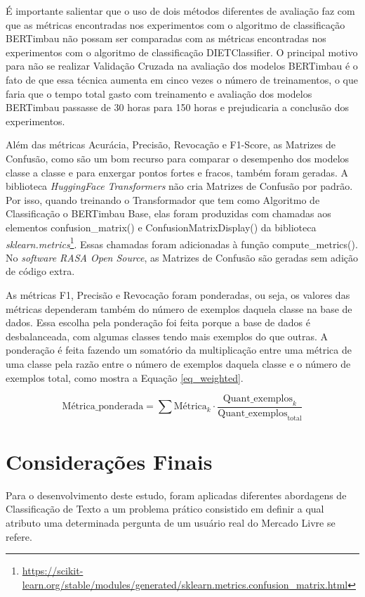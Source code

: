 É importante salientar que o uso de dois métodos diferentes de avaliação faz com que as métricas encontradas nos experimentos com o algoritmo de classificação BERTimbau não possam ser comparadas com as métricas encontradas nos experimentos com o algoritmo de classificação DIETClassifier. O principal motivo para não se realizar Validação Cruzada na avaliação dos modelos BERTimbau é o fato de que essa técnica aumenta em cinco vezes o número de treinamentos, o que faria que o tempo total gasto com treinamento e avaliação dos modelos BERTimbau passasse de 30 horas para 150 horas e prejudicaria a conclusão dos experimentos.

Além das métricas Acurácia, Precisão, Revocação e F1-Score, as Matrizes de Confusão, como são um bom recurso para comparar o desempenho dos modelos classe a classe e para enxergar pontos fortes e fracos, também foram geradas. A biblioteca \textit{HuggingFace Transformers} não cria Matrizes de Confusão por padrão. Por isso, quando treinando o Transformador que tem como Algoritmo de Classificação o BERTimbau Base, elas foram produzidas com chamadas aos elementos confusion\_matrix() e ConfusionMatrixDisplay() da biblioteca \textit{sklearn.metrics}\footnote{\url{https://scikit-learn.org/stable/modules/generated/sklearn.metrics.confusion_matrix.html}}. Essas chamadas foram adicionadas à função compute\_metrics(). No \textit{software RASA Open Source}, as Matrizes de Confusão são geradas sem adição de código extra.

As métricas F1, Precisão e Revocação foram ponderadas, ou seja, os valores das métricas dependeram também do número de exemplos daquela classe na base de dados. Essa escolha pela ponderação foi feita porque a base de dados é desbalanceada, com algumas classes tendo mais exemplos do que outras. A ponderação é feita fazendo um somatório da multiplicação entre uma métrica de uma classe pela razão entre o número de exemplos daquela classe e o número de exemplos total, como mostra a Equação \ref{eq_weighted}.

\begin{equation}
\label{eq_weighted}
\text{Métrica\_ponderada} = \sum \text{Métrica}_k \cdot \frac{\text{Quant\_exemplos}_k}{\text{Quant\_exemplos}_{\text{total}}}
\end{equation}

\section{Considerações Finais}
Para o desenvolvimento deste estudo, foram aplicadas diferentes abordagens de Classificação de Texto a um problema prático consistido em definir a qual atributo uma determinada pergunta de um usuário real do Mercado Livre se refere.

